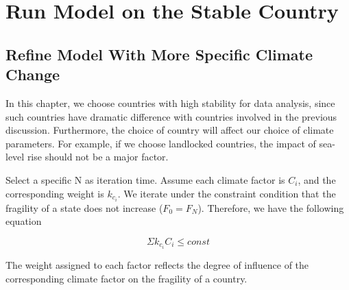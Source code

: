 \documentclass{mcmthesis}
\begin{document}
	\section{Run Model on the Stable Country}
	\subsection{Refine Model With More Specific Climate Change}
	In this chapter, we choose countries with high stability for data analysis, since such countries have dramatic difference with countries involved in the previous discussion. Furthermore, the choice of country will affect our choice of climate parameters. For example, if we choose landlocked countries, the impact of sea-level rise should not be a major factor.
	
	Select a specific N as iteration time. Assume each climate factor is $C_i$, and the corresponding weight is $k_{c_i}$.  We iterate under the constraint condition that the fragility of a state does not increase ($F_0 = F_N$). Therefore, we have the following equation
	
	$$
	\Sigma k_{c_i} C_i \leq const
	$$
	
	The weight assigned to each factor reflects the degree of influence of the corresponding climate factor on the fragility of a country.
	
\end{document}

